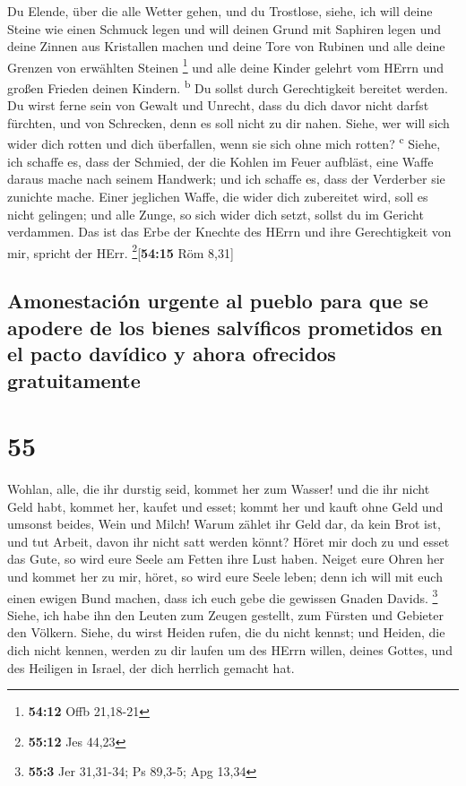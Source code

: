  Du Elende, über die alle Wetter gehen, und du Trostlose,
siehe, ich will deine Steine wie einen Schmuck legen und will deinen
Grund mit Saphiren legen  und deine Zinnen aus Kristallen
machen und deine Tore von Rubinen und alle deine Grenzen von erwählten
Steinen \footnote{\textbf{54:12} Offb 21,18-21}  und alle
deine Kinder gelehrt vom HErrn und großen Frieden deinen Kindern.
\textsuperscript{b}  Du sollst durch Gerechtigkeit
bereitet werden. Du wirst ferne sein von Gewalt und Unrecht, dass du
dich davor nicht darfst fürchten, und von Schrecken, denn es soll nicht
zu dir nahen.  Siehe, wer will sich wider dich rotten und
dich überfallen, wenn sie sich ohne mich rotten? \textsuperscript{c}
 Siehe, ich schaffe es, dass der Schmied, der die Kohlen
im Feuer aufbläst, eine Waffe daraus mache nach seinem Handwerk; und ich
schaffe es, dass der Verderber sie zunichte mache.  Einer
jeglichen Waffe, die wider dich zubereitet wird, soll es nicht gelingen;
und alle Zunge, so sich wider dich setzt, sollst du im Gericht
verdammen. Das ist das Erbe der Knechte des HErrn und ihre Gerechtigkeit
von mir, spricht der HErr. \footnote{\textbf{55:12} Jes 44,23}{[}\textbf{54:15}
Röm 8,31{]}

\hypertarget{amonestaciuxf3n-urgente-al-pueblo-para-que-se-apodere-de-los-bienes-salvuxedficos-prometidos-en-el-pacto-davuxeddico-y-ahora-ofrecidos-gratuitamente}{%
\subsection{Amonestación urgente al pueblo para que se apodere de los
bienes salvíficos prometidos en el pacto davídico y ahora ofrecidos
gratuitamente}\label{amonestaciuxf3n-urgente-al-pueblo-para-que-se-apodere-de-los-bienes-salvuxedficos-prometidos-en-el-pacto-davuxeddico-y-ahora-ofrecidos-gratuitamente}}

\hypertarget{section-54}{%
\section{55}\label{section-54}}

 Wohlan, alle, die ihr durstig seid, kommet her zum
Wasser! und die ihr nicht Geld habt, kommet her, kaufet und esset; kommt
her und kauft ohne Geld und umsonst beides, Wein und Milch!
 Warum zählet ihr Geld dar, da kein Brot ist, und tut
Arbeit, davon ihr nicht satt werden könnt? Höret mir doch zu und esset
das Gute, so wird eure Seele am Fetten ihre Lust haben. 
Neiget eure Ohren her und kommet her zu mir, höret, so wird eure Seele
leben; denn ich will mit euch einen ewigen Bund machen, dass ich euch
gebe die gewissen Gnaden Davids. \footnote{\textbf{55:3} Jer 31,31-34;
  Ps 89,3-5; Apg 13,34}  Siehe, ich habe ihn den Leuten
zum Zeugen gestellt, zum Fürsten und Gebieter den Völkern.
 Siehe, du wirst Heiden rufen, die du nicht kennst; und
Heiden, die dich nicht kennen, werden zu dir laufen um des HErrn willen,
deines Gottes, und des Heiligen in Israel, der dich herrlich gemacht
hat.

